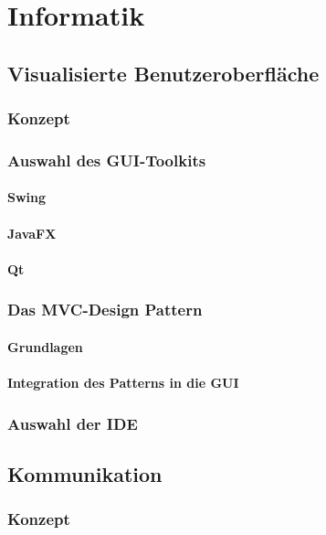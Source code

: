
\chapter{Informatik}

\section{Visualisierte Benutzeroberfläche}
\label{sec:gui}
\subsection{Konzept}

\subsection{Auswahl des GUI-Toolkits}
\subsubsection{Swing}
\subsubsection{JavaFX}
\subsubsection{Qt}

\subsection{Das MVC-Design Pattern}
\subsubsection{Grundlagen}
\subsubsection{Integration des Patterns in die GUI}

\subsection{Auswahl der IDE}

\section{Kommunikation}
\label{sec:communication}
\subsection{Konzept}

